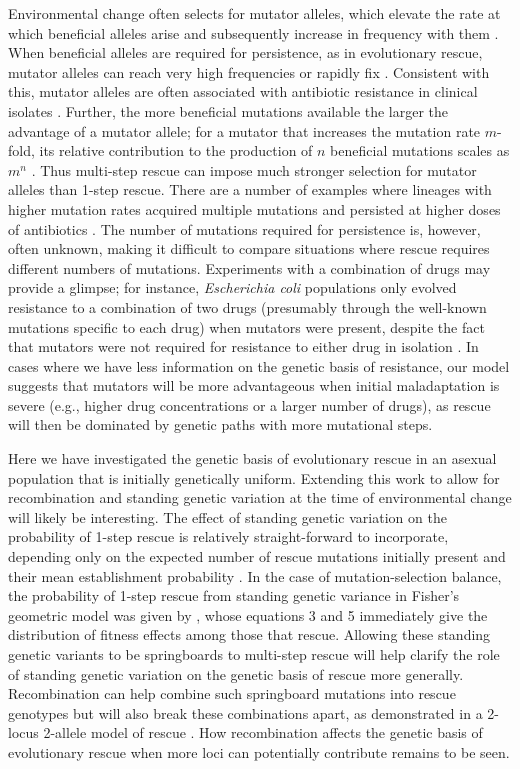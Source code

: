 \documentclass[9pt,twocolumn,twoside,lineno]{gsajnl}
\begin{document}
Environmental change often selects for mutator alleles, which elevate the rate at which beneficial alleles arise and subsequently increase in frequency with them \citep{tenaillon2001second}.
When beneficial alleles are required for persistence, as in evolutionary rescue, mutator alleles can reach very high frequencies or rapidly fix \citep[e.g.,][]{mao1997proliferation}.
Consistent with this, mutator alleles are often associated with antibiotic resistance in clinical isolates \citep[see examples in][]{Bell2017}.
Further, the more beneficial mutations available the larger the advantage of a mutator allele; for a mutator that increases the mutation rate $m$-fold, its relative contribution to the production of $n$ beneficial mutations scales as $m^n$ \citep{tenaillon1999mutators}.
Thus multi-step rescue can impose much stronger selection for mutator alleles than 1-step rescue.
There are a number of examples where lineages with higher mutation rates acquired multiple mutations and persisted at higher doses of antibiotics \citep{couce2015bypass,san2017multicopy}.
The number of mutations required for persistence is, however, often unknown, making it difficult to compare situations where rescue requires different numbers of mutations.
Experiments with a combination of drugs may provide a glimpse; for instance, \textit{Escherichia coli} populations only evolved resistance to a combination of two drugs (presumably through the well-known mutations specific to each drug) when mutators were present, despite the fact that mutators were not required for resistance to either drug in isolation \citep{gifford2019mutators}. 
In cases where we have less information on the genetic basis of resistance, our model suggests that mutators will be more advantageous when initial maladaptation is severe (e.g., higher drug concentrations or a larger number of drugs), as rescue will then be dominated by genetic paths with more mutational steps.

Here we have investigated the genetic basis of evolutionary rescue in an asexual population that is initially genetically uniform. 
Extending this work to allow for recombination and standing genetic variation at the time of environmental change will likely be interesting. 
The effect of standing genetic variation on the probability of 1-step rescue is relatively straight-forward to incorporate, depending only on the expected number of rescue mutations initially present and their mean establishment probability \citep{Martin2013}. 
In the case of mutation-selection balance, the probability of 1-step rescue from standing genetic variance in Fisher's geometric model was given by \cite{Anciaux2018}, whose equations 3 and 5 immediately give the distribution of fitness effects among those that rescue.
Allowing these standing genetic variants to be springboards to multi-step rescue will help clarify the role of standing genetic variation on the genetic basis of rescue more generally.
Recombination can help combine such springboard mutations into rescue genotypes but will also break these combinations apart, as demonstrated in a 2-locus 2-allele model of rescue \citep{Uecker2016}.
How recombination affects the genetic basis of evolutionary rescue when more loci can potentially contribute remains to be seen.
\end{document}
